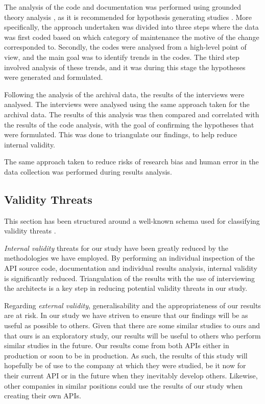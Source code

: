 \documentclass[10pt,twocolumn]{article}
\begin{document}
The analysis of the code and documentation was performed using grounded theory analysis \cite{seaman1999qualitative}, as it is recommended for hypothesis generating studies \cite{runeson2009guidelines} \cite{seaman1999qualitative}. More specifically, the approach undertaken was divided into three steps where the data was first coded based on which category of maintenance \cite{lientz1980software} the motive of the change corresponded to. Secondly, the codes were analysed from a high-level point of view, and the main goal was to identify trends in the codes. The third step involved analysis of these trends, and it was during this stage the hypotheses were generated and formulated. 

Following the analysis of the archival data, the results of the interviews were analysed. The interviews were analysed using the same approach taken for the archival data. The results of this analysis was then compared and correlated with the results of the code analysis, with the goal of confirming the hypotheses that were formulated. This was done to triangulate our findings, to help reduce internal validity. 

The same approach taken to reduce risks of research bias and human error in the data collection was performed during results analysis. 


\subsection{Validity Threats}
This section has been structured around a well-known schema used for classifying validity threats \cite{runeson2009guidelines}.

\textit{Internal validity} threats for our study have been greatly reduced by the methodologies we have employed. By performing an individual inspection of  the API source code, documentation and individual results analysis, internal validity is significantly reduced. Triangulation of the results with the use of interviewing the architects is a key step in reducing potential validity threats in our study.

Regarding \textit{external validity}, generalisability and the appropriateness of our results are at risk. In our study we have striven to ensure that our findings will be as useful as possible to others. Given that there are some similar studies to ours and that ours is an exploratory study, our results will be useful to others who perform similar studies in the future. Our results come from both APIs either in production or soon to be in production. As such, the results of this study will hopefully be of use to the company at which they were studied, be it now for their current API or in the future when they inevitably develop others. Likewise, other companies in similar positions could use the results of our study when creating their own APIs.
\end{document}
